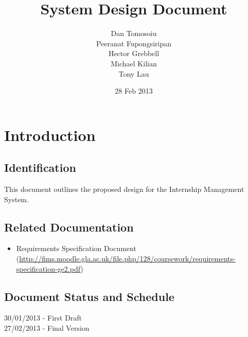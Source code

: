 \documentclass{l3deliverable}
\title{System Design Document}
\author{
  Dan Tomosoiu \\
  Peeranat Fupongsiripan \\
  Hector Grebbell \\
  Michael Kilian \\
  Tony Lau \\
}
\date{28 Feb 2013}
\begin{document}

\maketitle


\section{Introduction}

\subsection{Identification}
This document outlines the proposed design for the Internship Management System. 
\subsection{Related Documentation}
\begin{itemize}
\item{Requirements Specification Document (\url{http://fims.moodle.gla.ac.uk/file.php/128/coursework/requirements-specification-ge2.pdf})}
\end{itemize}
 

\subsection{Document Status and Schedule}
30/01/2013 - First Draft\\
27/02/2013 - Final Version
\end{document}
